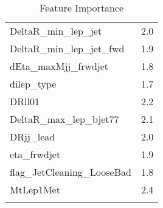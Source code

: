 \begin{longtable}{ll}
    DeltaR\_min\_lep\_jet        & 2.0                          \\
    DeltaR\_min\_lep\_jet\_fwd   & 1.9                          \\
    dEta\_maxMjj\_frwdjet        & 1.8                          \\
    dilep\_type                  & 1.7                          \\
    DRll01                       & 2.2                          \\
    DeltaR\_max\_lep\_bjet77     & 2.1                          \\
    DRjj\_lead                   & 2.0                          \\
    eta\_frwdjet                 & 1.9                          \\
    flag\_JetCleaning\_LooseBad  & 1.8                          \\
    MtLep1Met                    & 2.4                          \\
    \caption{Feature Importance}
    \label{tab:feature_importance}
\end{longtable}
